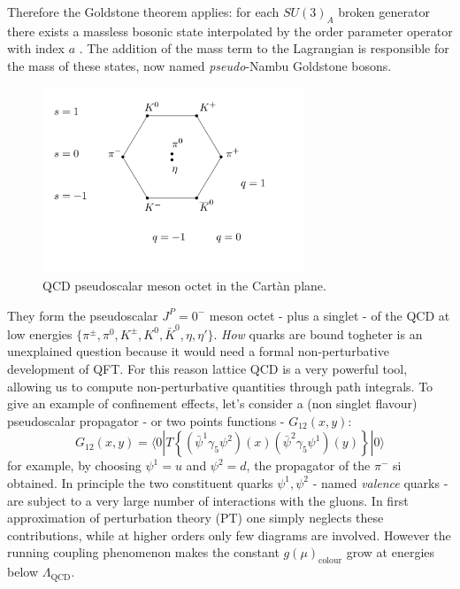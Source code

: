 \documentclass[english, LaM, oneside, noexaminfo]{sapthesis}
\newcommand{\la}{\langle}
\newcommand{\ra}{\rangle}
\begin{document}
Therefore the Goldstone theorem applies: for each $SU(3)_A$ broken generator there exists a massless bosonic state interpolated by the order parameter operator with index $a$ \cite{Goldstone-Theorem}.
The addition of the mass term to the Lagrangian is responsible for the mass of these states, now named {\it pseudo}-Nambu Goldstone bosons.
\begin{figure}[!h]
    \centering
    \includegraphics[width=0.7\textwidth]{imgs-MSc-thesis/ottuplice_via.pdf}
    \caption{QCD pseudoscalar meson octet in the Cartàn plane.}
    \label{fig:meson_octet}
\end{figure}
\newline
They form the pseudoscalar $J^P = 0^-$ meson octet - plus a singlet - of the QCD at low energies $\{ \pi^\pm,\pi^0,K^\pm,K^0,\bar K^0,\eta,\eta' \}$.
\textit{How} quarks are bound togheter is an unexplained question because it would need a formal non-perturbative development of QFT.
For this reason lattice QCD is a very powerful tool, allowing us to compute non-perturbative quantities through path integrals.
\newline
To give an example of confinement effects, let's consider a (non singlet flavour) pseudoscalar propagator - or two points functions - $G_{12}(x,y)$:
\begin{equation*}
    G_{12}(x,y) = \la 0 | T \left\{ ( \bar\psi^1 \gamma_5 \psi^2 )(x) ( \bar\psi^2 \gamma_5 \psi^1 )(y) \right\} | 0 \ra
\end{equation*}
for example, by choosing $\psi^1 = u$ and $\psi^2 = d$, the propagator of the $\pi^-$ si obtained.
In principle the two constituent quarks $\psi^1, \psi^2$ - named \textit{valence} quarks - are subject to a very large number of interactions with the gluons.
In first approximation of perturbation theory (PT) one simply neglects these contributions, while at higher orders only few diagrams are involved.
However the running coupling phenomenon makes the constant $g(\mu)_\text{colour}$ grow at energies below $\Lambda_\text{QCD}$. 
\end{document}
